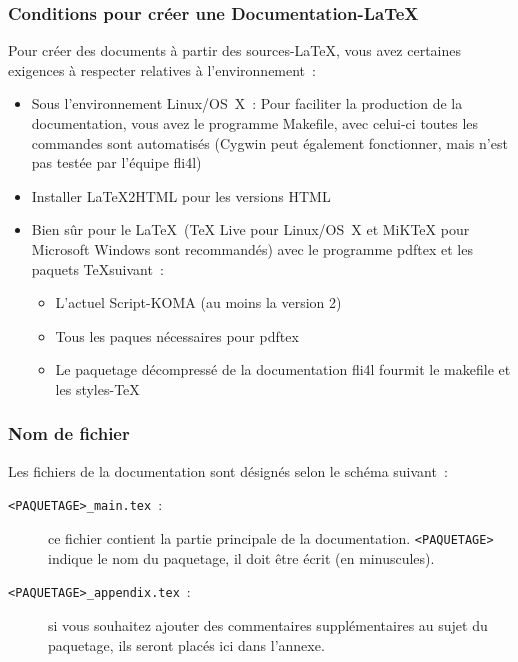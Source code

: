 \subsubsection{Conditions pour créer une Documentation-\LaTeX}

  Pour créer des documents à partir des sources-\LaTeX, vous avez certaines
  exigences à respecter relatives à l'environnement~:

  \begin{itemize}
  \item Sous l’environnement Linux/OS~X~: Pour faciliter la production de la
    documentation, vous avez le programme Makefile, avec celui-ci toutes les
    commandes sont automatisés (Cygwin peut également fonctionner, mais n'est
	pas testée par l'équipe fli4l)
  \item Installer LaTeX2HTML pour les versions HTML
  \item Bien sûr pour le \LaTeX\ (\og{}TeX Live\fg{} pour Linux/OS~X et
  \og{}MiKTeX\fg{} pour Microsoft Windows sont recommandés) avec le programme
    \og{}pdftex\fg{} et les paquets \TeX suivant~:
    \begin{itemize}
    \item L'actuel Script-KOMA (au moins la version 2)
    \item Tous les paques nécessaires pour pdftex
    \item Le paquetage décompressé de la documentation fli4l fourmit le makefile et
	les styles-\TeX
  \end{itemize}
  \end{itemize}


\subsubsection{Nom de fichier}

Les fichiers de la documentation sont désignés selon le schéma suivant~:

\begin{description}
\item [\texttt{<PAQUETAGE>\_main.tex}~:] ce fichier contient la partie principale
  de la documentation. \texttt{<PAQUETAGE>} indique le nom du paquetage, il doit
  être écrit (en minuscules).
\item [\texttt{<PAQUETAGE>\_appendix.tex}~:] si vous souhaitez ajouter des
  commentaires supplémentaires au sujet du paquetage, ils seront placés
  ici dans l’annexe.
\end{description}

